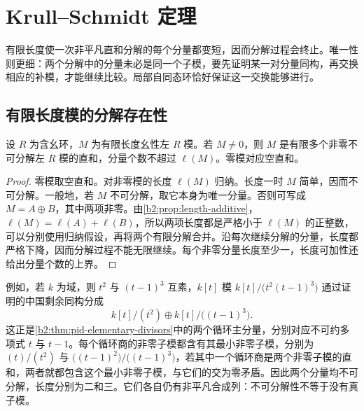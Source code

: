 
\section{Krull–Schmidt 定理}
\label{b2:sec:1204}

有限长度使一次非平凡直和分解的每个分量都变短，因而分解过程会终止。唯一性则更细：两个分解中的分量未必是同一个子模，要先证明某一对分量同构，再交换相应的补模，才能继续比较。局部自同态环恰好保证这一交换能够进行。

%
%
%

\subsection{有限长度模的分解存在性}
\label{b2:subsec:1204:01}

\begin{proposition}\label{b2:prop:finite-length-decomposition}
	设 \(R\) 为含幺环，\(M\) 为有限长度幺性左 \(R\) 模。若 \(M\ne0\)，则 \(M\) 是有限多个非零不可分解左 \(R\) 模的直和，分量个数不超过 \(\ell(M)\)。零模对应空直和。
\end{proposition}
\begin{proof}
	零模取空直和。对非零模的长度 \(\ell(M)\) 归纳。长度一时 \(M\) 简单，因而不可分解。一般地，若 \(M\) 不可分解，取它本身为唯一分量。否则可写成 \(M=A\oplus B\)，其中两项非零。由\cref{b2:prop:length-additive}，\(\ell(M)=\ell(A)+\ell(B)\)，所以两项长度都是严格小于 \(\ell(M)\) 的正整数，可以分别使用归纳假设，再将两个有限分解合并。沿每次继续分解的分量，长度都严格下降，因而分解过程不能无限继续。每个非零分量长度至少一，长度可加性还给出分量个数的上界。
\end{proof}

例如，若 \(k\) 为域，则 \(t^2\) 与 \((t-1)^3\) 互素，\(k[t]\) 模 \(k[t]/\bigl(t^2(t-1)^3\bigr)\) 通过证明的中国剩余同构分成
\[
	k[t]/(t^2)\oplus k[t]/\bigl((t-1)^3\bigr).
\]
这正是\cref{b2:thm:pid-elementary-divisors}中的两个循环主分量，分别对应不可约多项式 \(t\) 与 \(t-1\)。每个循环商的非零子模都含有其最小非零子模，分别为 \((t)/(t^2)\) 与 \(\bigl((t-1)^2\bigr)/\bigl((t-1)^3\bigr)\)，若其中一个循环商是两个非零子模的直和，两者就都包含这个最小非零子模，与它们的交为零矛盾。因此两个分量均不可分解，长度分别为二和三。它们各自仍有非平凡合成列：不可分解性不等于没有真子模。

